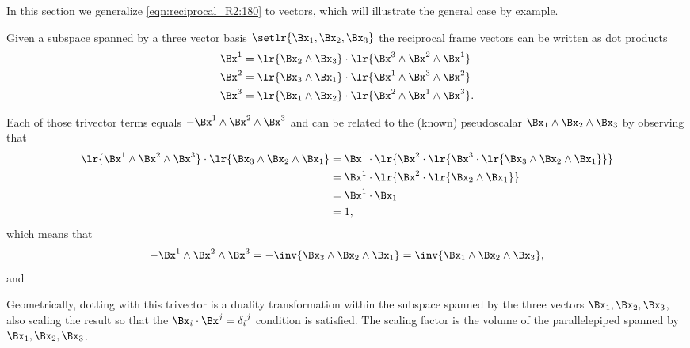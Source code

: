 %
%

In this section we generalize \cref{eqn:reciprocal_R2:180} to  vectors, which will illustrate the general case by example.

Given
a subspace spanned by a three vector basis \( \setlr{ \Bx_1, \Bx_2, \Bx_3 } \) the reciprocal frame vectors can be written as dot products
\begin{dmath}\label{eqn:reciprocal_R3:320}
\begin{aligned}
\Bx^1 &= \lr{ \Bx_2 \wedge \Bx_3 } \cdot \lr{ \Bx^3 \wedge \Bx^2 \wedge \Bx^1 } \\
\Bx^2 &= \lr{ \Bx_3 \wedge \Bx_1 } \cdot \lr{ \Bx^1 \wedge \Bx^3 \wedge \Bx^2 } \\
\Bx^3 &= \lr{ \Bx_1 \wedge \Bx_2 } \cdot \lr{ \Bx^2 \wedge \Bx^1 \wedge \Bx^3 }.
\end{aligned}
\end{dmath}

Each of those trivector terms equals \( - \Bx^1 \wedge \Bx^2 \wedge \Bx^3 \) and can be related to the (known) pseudoscalar \( \Bx_1 \wedge \Bx_2 \wedge \Bx_3 \) by observing that
\begin{equation}\label{eqn:reciprocal_R3:340}
\begin{aligned}
\lr{ \Bx^1 \wedge \Bx^2 \wedge \Bx^3 } \cdot \lr{ \Bx_3 \wedge \Bx_2 \wedge \Bx_1 }
&= \Bx^1 \cdot \lr{ \Bx^2 \cdot \lr{ \Bx^3 \cdot \lr{ \Bx_3 \wedge \Bx_2 \wedge \Bx_1 } }} \\
&= \Bx^1 \cdot \lr{ \Bx^2 \cdot \lr{ \Bx_2 \wedge \Bx_1 } } \\
&= \Bx^1 \cdot \Bx_1 \\
&= 1,
\end{aligned}
\end{equation}
which means that
\begin{dmath}\label{eqn:reciprocal_R3:360}
-\Bx^1 \wedge \Bx^2 \wedge \Bx^3
= -\inv{ \Bx_3 \wedge \Bx_2 \wedge \Bx_1 }
= \inv{ \Bx_1 \wedge \Bx_2 \wedge \Bx_3 },
\end{dmath}
and

Geometrically, dotting with this trivector is a duality transformation within the subspace spanned by the three vectors \( \Bx_1, \Bx_2, \Bx_3 \), also scaling the result so that the \( \Bx_i \cdot \Bx^j = {\delta_i}^j \) condition is satisfied.  The scaling factor is the volume of the parallelepiped spanned by \( \Bx_1, \Bx_2, \Bx_3 \).
